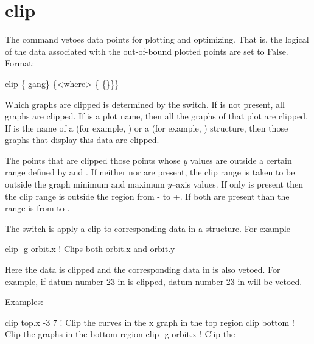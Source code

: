\section{clip}
\label{s:clip}

The  command vetoes data points for plotting and
optimizing. That is, the  logical of the data
associated with the out-of-bound plotted points are set to False.
Format:
\begin{example}
  clip \{-gang\} \{<where> \{<limit1> \{<limit2>\}\}\}
\end{example}

\vskip 0.2in 

Which graphs are clipped is determined by the  switch. If
 is not present, all graphs are clipped. If  is a
plot name, then all the graphs of that plot are clipped. If 
is the name of a  (for example, ) or a
 (for example, ) structure, then those graphs
that display this data are clipped.

The points that are clipped those points whose $y$ values are outside
a certain range defined by  and . If neither
 nor  are present, the clip range is taken
to be outside the graph minimum and maximum $y$--axis values. If only
 is present then the clip range is outside the region
from - to +. If both are present than the
range is from  to .

The  switch is apply a clip to corresponding data in a 
structure. For example
\begin{example}
  clip -g orbit.x   ! Clips both orbit.x and orbit.y 
\end{example}
Here the  data is clipped and the corresponding data in
 is also vetoed. For example, if datum number 23 in
 is clipped, datum number 23 in  will be
vetoed.

Examples:
\begin{example}
  clip top.x -3  7  ! Clip the curves in the x graph in the top region
  clip bottom       ! Clip the graphs in the bottom region
  clip -g orbit.x   ! Clip the 
\end{example}

